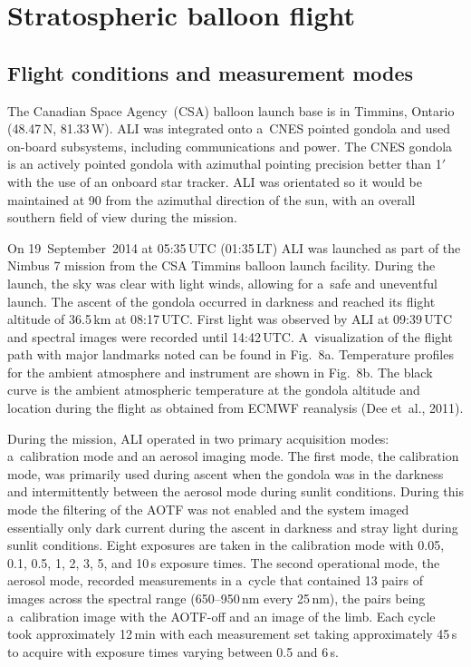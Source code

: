 \documentclass[amt]{copernicus}
\begin{document}
\section{Stratospheric balloon flight}
\subsection{Flight conditions and measurement modes}

The Canadian Space Agency~(CSA) balloon launch base is in Timmins,
Ontario (48.47{\degree}\,N, 81.33{\degree}\,W). ALI was integrated
onto a~CNES pointed gondola and used on-board subsystems, including
communications and power. The CNES gondola is an actively pointed
gondola with azimuthal pointing precision better than 1$'$ with the use
of an onboard star tracker. ALI was orientated so it would be
maintained at 90{\degree} from the azimuthal direction of the sun,
with an overall southern field of view during the mission.

On 19~September~2014 at 05:35\,UTC (01:35\,LT) ALI was launched as
part of the Nimbus 7 mission from the CSA Timmins balloon launch
facility.  During the launch, the sky was clear with light winds,
allowing for a~safe and uneventful launch. The ascent of the gondola
occurred in darkness and reached its flight altitude of
36.5\,\unit{km} at 08:17\,UTC. First light was observed by ALI at
09:39\,UTC and spectral images were recorded until 14:42\,UTC.
A~visualization of the flight path with major landmarks noted can be
found in Fig.~8a. Temperature profiles for the ambient atmosphere and
instrument are shown in Fig.~8b. The black curve is the ambient
atmospheric temperature at the gondola altitude and location during
the flight as obtained from ECMWF reanalysis (Dee et~al., 2011).




During the mission, ALI operated in two primary acquisition modes:
a~calibration mode and an aerosol imaging mode. The first mode, the
calibration mode, was primarily used during ascent when the gondola
was in the darkness and intermittently between the aerosol mode during
sunlit conditions. During this mode the filtering of the AOTF was not
enabled and the system imaged essentially only dark current during the
ascent in darkness and stray light during sunlit conditions. Eight
exposures are taken in the calibration mode with 0.05, 0.1, 0.5, 1, 2,
3, 5, and 10\,s exposure times. The second operational mode, the aerosol
mode, recorded measurements in a~cycle that contained 13 pairs of
images across the spectral range (650--950\,\unit{nm} every
25\,\unit{nm}), the pairs being a~calibration image with the
AOTF-off and an image of the limb. Each cycle took approximately
12\,min with each measurement set taking approximately 45\,s to
acquire with exposure times varying between 0.5 and 6\,s.
\end{document}
